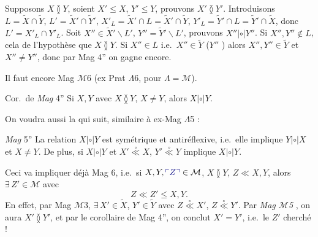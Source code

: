 \documentclass[11pt,a4paper]{article}
\begin{document}

Supposons $X \between Y$, soient $X' \leq X$, $Y' \leq Y$, prouvons $X' \between Y'$. Introduisons \struck{$\between$} $L = \widetilde{X} \cap \widetilde{Y}$, $L' = \widetilde{X}' \cap \widetilde{Y}'$, $X'_L = \widetilde{X}' \cap L = \widetilde{X}' \cap \widetilde{Y}$, $Y'_L = \widetilde{Y}' \cap L = \widetilde{Y}' \cap \widetilde{X}$, donc $L' = X'_L \cap Y'_L$. Soit $X'' \in \widetilde{X}' \smallsetminus L'$, $Y'' = \widetilde{Y}' \smallsetminus L'$, prouvons $X'' \mathrel{|{\circ}|} Y''$. Si $X'', Y'' \notin L$, cela  de l'hypothèse que $X \between Y$. Si $X'' \in L$ i.e.\ $X'' \in \widetilde{Y}$ ($Y''$  \ill{}) alors $X'', Y'' \in \widetilde{Y}$ et $X'' \neq Y''$, donc par Mag 4'' on gagne encore.

Il faut encore  Mag $\mathcal{M}$6 (ex Prat $\Lambda$6, pour $\Lambda = \mathcal{M}$).

Cor.\ de \emph{Mag} 4'' Si $X, Y$ avec $X \between Y$, $X \neq Y$, alors $X \mathrel{|{\circ}|} Y$.

On voudra aussi la  qui suit, similaire à ex-Mag $\Lambda$5 :

\emph{Mag} 5''  La relation $X \mathrel{|{\circ}|} Y$ est symétrique et antiréflexive, i.e.\ elle implique $Y \mathrel{|{\circ}|} X$ et $X \neq Y$. De plus, si $X \mathrel{|{\circ}|} Y$ et $X' \mathrel{\overset{\circ}{\ll}} X$, $Y' \mathrel{\overset{\circ}{\ll}} Y$ implique $X \mathrel{|{\circ}|} Y$.

Ceci va impliquer déjà Mag 6, i.e.\ si $X, Y, \add{Z} \in \mathcal{M}$, $X \between Y$, $Z \ll X, Y$, alors $\exists\, Z' \in \mathcal{M}$ avec
\[
  Z \ll Z' \leq X, Y .
\]
En effet, par Mag $\mathcal{M}$3,  $\exists\, X' \in \widetilde{X}$, $Y' \in \widetilde{Y}$ avec $Z \mathrel{\overset{\circ}{\ll}} X'$, $Z \mathrel{\overset{\circ}{\ll}} Y'$. Par \emph{Mag $\mathcal{M}$5} , on aura $X' \between Y'$, et par le corollaire de Mag 4'', on conclut $X' = Y'$, i.e.\ le $Z'$ cherché !
\end{document}
